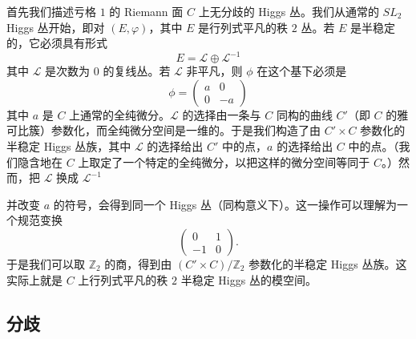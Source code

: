 首先我们描述亏格 $1$ 的 Riemann 面 $C$ 上无分歧的 Higgs 丛。我们从通常的 $SL_2$ Higgs 丛开始，即对 $(E,\varphi)$，其中 $E$ 是行列式平凡的秩 $2$ 丛。若 $E$ 是半稳定的，它必须具有形式
\begin{equation}\tag{3.1}
E=\mathcal{L}\oplus\mathcal{L}^{-1}
\end{equation}
其中 $\mathcal{L}$ 是次数为 $0$ 的复线丛。若 $\mathcal{L}$ 非平凡，则 $\phi$ 在这个基下必须是
\begin{equation}\tag{3.2}
\phi=
\begin{pmatrix}
a & 0\\
0 & -a
\end{pmatrix}
\end{equation}
其中 $a$ 是 $C$ 上通常的全纯微分。$\mathcal{L}$ 的选择由一条与 $C$ 同构的曲线 $C'$（即 $C$ 的雅可比簇）参数化，而全纯微分空间是一维的。于是我们构造了由 $C'\times C$ 参数化的半稳定 Higgs 丛族，其中 $\mathcal{L}$ 的选择给出 $C'$ 中的点，$a$ 的选择给出 $C$ 中的点。（我们隐含地在 $C$ 上取定了一个特定的全纯微分，以把这样的微分空间等同于 $C$。）然而，把 $\mathcal{L}$ 换成 $\mathcal{L}^{-1}$


并改变 $a$ 的符号，会得到同一个 Higgs 丛（同构意义下）。这一操作可以理解为一个规范变换
\begin{equation}\tag{3.3}
\begin{pmatrix}
0 & 1\\
-1 & 0
\end{pmatrix}.
\end{equation}
于是我们可以取 $\mathbb{Z}_2$ 的商，得到由 $(C'\times C)/\mathbb{Z}_2$ 参数化的半稳定 Higgs 丛族。这实际上就是 $C$ 上行列式平凡的秩 $2$ 半稳定 Higgs 丛的模空间。

\subsection{分歧}

